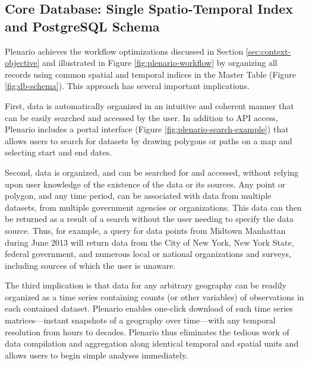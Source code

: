\documentclass[11pt]{article}
\begin{document}
\subsection{\textbf{Core Database: Single Spatio-Temporal Index and PostgreSQL Schema}}\label{sec:core-database}
Plenario achieves the workflow optimizations discussed in Section \ref{sec:context-objective} and illustrated in Figure \ref{fig:plenario-workflow} by organizing all records using common spatial and temporal indices in the Master Table (Figure \ref{fig:db-schema}). This approach has several important implications. 

First, data is automatically organized in an intuitive and coherent manner that can be easily searched and accessed by the user. In addition to API access, Plenario includes a portal interface (Figure \ref{fig:plenario-search-example}) that allows users to search for datasets by drawing polygons or paths on a map and selecting start and end dates. 

Second, data is organized, and can be searched for and accessed, without relying upon user knowledge of the existence of the data or its sources. Any point or polygon, and any time period, can be associated with data from multiple datasets, from multiple government agencies or organizations. This data can then be returned as a result of a search without the user needing to specify the data source. Thus, for example, a query for data points from Midtown Manhattan during June 2013 will return data from the City of New York, New York State, federal government, and numerous local or national organizations and surveys, including sources of which the user is unaware. 

The third implication is that data for any arbitrary geography can be readily organized as a time series containing counts (or other variables) of observations in each contained dataset. Plenario enables one-click download of such time series matrices---instant snapshots of a geography over time---with any temporal resolution from hours to decades. Plenario thus eliminates the tedious work of data compilation and aggregation along identical temporal and spatial units and allows users to begin simple analyses immediately.
\end{document}
